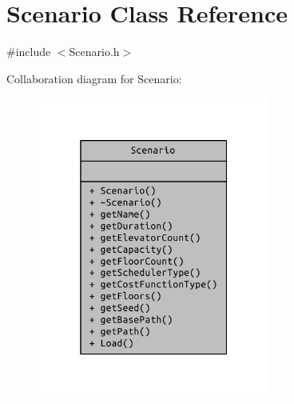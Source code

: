 \hypertarget{class_scenario}{}\section{Scenario Class Reference}
\label{class_scenario}


{\ttfamily \#include $<$Scenario.\+h$>$}



Collaboration diagram for Scenario\+:
\nopagebreak
\begin{figure}[H]
\begin{center}
\leavevmode
\includegraphics[width=217pt]{class_scenario__coll__graph}
\end{center}
\end{figure}
